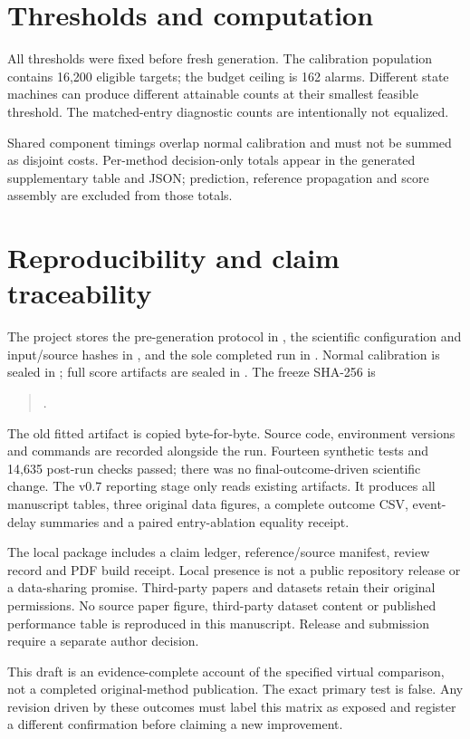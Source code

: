 \section{Thresholds and computation}
All thresholds were fixed before fresh generation. The calibration population contains 16,200 eligible targets; the budget ceiling is 162 alarms. Different state machines can produce different attainable counts at their smallest feasible threshold. The matched-entry diagnostic counts are intentionally not equalized.
\begin{center}\small\end{center}
\begin{center}\small\end{center}
Shared component timings overlap normal calibration and must not be summed as disjoint costs. Per-method decision-only totals appear in the generated supplementary table and JSON; prediction, reference propagation and score assembly are excluded from those totals.
\clearpage
\section{Reproducibility and claim traceability}
The project stores the pre-generation protocol in , the scientific configuration and input/source hashes in , and the sole completed run in . Normal calibration is sealed in ; full score artifacts are sealed in . The freeze SHA-256 is
\begin{quote}\small{}.\end{quote}
The old fitted artifact is copied byte-for-byte. Source code, environment versions and commands are recorded alongside the run. Fourteen synthetic tests and 14,635 post-run checks passed; there was no final-outcome-driven scientific change. The v0.7 reporting stage only reads existing artifacts. It produces all manuscript tables, three original data figures, a complete outcome CSV, event-delay summaries and a paired entry-ablation equality receipt.

The local package includes a claim ledger, reference/source manifest, review record and PDF build receipt. Local presence is not a public repository release or a data-sharing promise. Third-party papers and datasets retain their original permissions. No source paper figure, third-party dataset content or published performance table is reproduced in this manuscript. Release and submission require a separate author decision.

This draft is an evidence-complete account of the specified virtual comparison, not a completed original-method publication. The exact primary test is false. Any revision driven by these outcomes must label this matrix as exposed and register a different confirmation before claiming a new improvement.
